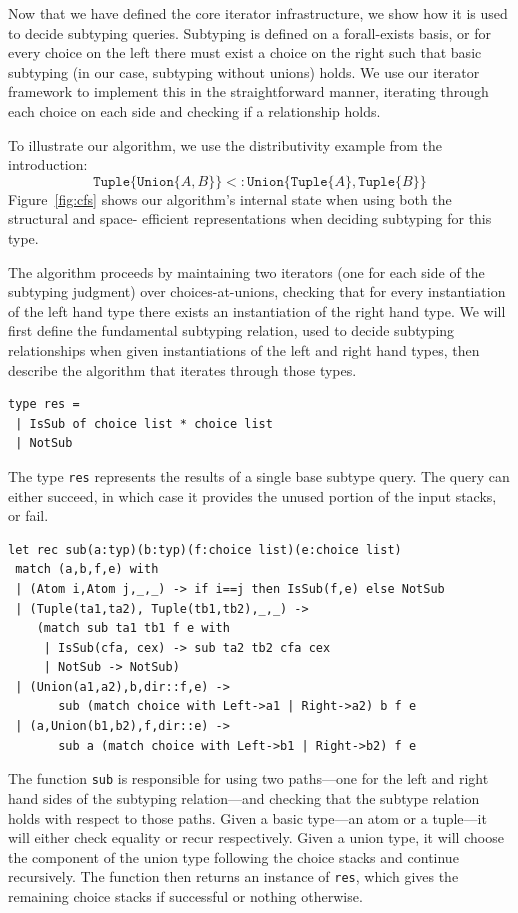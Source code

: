 \documentclass[a4paper,english]{lipics-v2019}
\newcommand{\xt}[1]{\texttt{#1}}
\newcommand{\union}[2]{\xt{Union\{}#1,#2\xt{\}}}
\newcommand{\tuple}[1]{\xt{Tuple\{}#1\xt{\}}}
\begin{document}
Now that we have defined the core iterator infrastructure, we show how it
is used to decide subtyping queries. Subtyping is defined on a forall-exists
basis, or for every choice on the left there must exist a choice on the right
such that basic subtyping (in our case, subtyping without unions) holds. We
use our iterator framework to implement this in the straightforward manner, 
iterating through each choice on each side and checking if a relationship holds.

To illustrate our algorithm, we use the  distributivity example from the
introduction: $$\tuple{\union{A}{B}} <: \union{\tuple{A}}{\tuple{B}}$$
Figure~\ref{fig:cfs} shows our algorithm's internal state when using  both the
structural and space- efficient representations when deciding subtyping for
this type.

The algorithm proceeds by maintaining two iterators (one for each side of
the subtyping judgment) over choices-at-unions, checking that for every
instantiation of the left hand type there exists an instantiation of the
right hand type. We will first define the fundamental subtyping relation,
used to decide subtyping relationships when given instantiations of the left
and right hand types, then describe the algorithm that iterates through
those types.

\begin{lstlisting}
type res =
 | IsSub of choice list * choice list
 | NotSub
\end{lstlisting}

The type \verb|res| represents the results of a single base subtype
query. The query can either succeed, in which case it provides the unused
portion of the input stacks, or fail.

\begin{lstlisting}
let rec sub(a:typ)(b:typ)(f:choice list)(e:choice list)
 match (a,b,f,e) with
 | (Atom i,Atom j,_,_) -> if i==j then IsSub(f,e) else NotSub
 | (Tuple(ta1,ta2), Tuple(tb1,tb2),_,_) ->
    (match sub ta1 tb1 f e with
     | IsSub(cfa, cex) -> sub ta2 tb2 cfa cex
     | NotSub -> NotSub)
 | (Union(a1,a2),b,dir::f,e) -> 
       sub (match choice with Left->a1 | Right->a2) b f e
 | (a,Union(b1,b2),f,dir::e) -> 
       sub a (match choice with Left->b1 | Right->b2) f e
\end{lstlisting}


The function \verb|sub| is responsible for using two
paths---one for the left and right hand sides of the subtyping
relation---and checking that the subtype relation holds with respect
to those paths. Given a basic type---an atom or a tuple---it will
either check equality or recur respectively. Given a union type, it
will choose the component of the union type following the choice
stacks and continue recursively. The function then returns an instance
of \verb|res|, which gives the remaining choice stacks if
successful or nothing otherwise.
\end{document}
